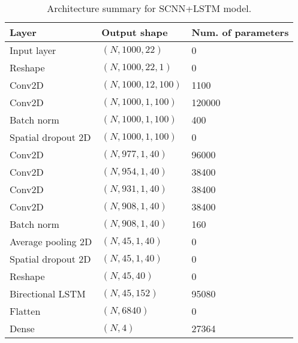 \documentclass{article}
\begin{document}
\begin{table}[H]
\small
\begin{center}
    \begin{tabular}{|l|l|l|}
        \hline
        Layer   & Output shape  & Num. of parameters \\
        \hline\hline
        Input layer         & $(N, 1000, 22)$       & 0         \\
        Reshape             & $(N, 1000, 22, 1)$    & 0         \\
        Conv2D              & $(N, 1000, 12, 100)$  & 1100      \\
        Conv2D              & $(N, 1000, 1, 100)$   & 120000    \\
        Batch norm          & $(N, 1000, 1, 100)$   & 400       \\
        Spatial dropout 2D  & $(N, 1000, 1, 100)$   & 0         \\
        Conv2D              & $(N, 977, 1, 40)$     & 96000     \\
        Conv2D              & $(N, 954, 1,40)$      & 38400     \\
        Conv2D              & $(N, 931, 1, 40)$     & 38400     \\
        Conv2D              & $(N, 908, 1, 40)$     & 38400     \\
        Batch norm          & $(N, 908, 1, 40)$     & 160       \\
        Average pooling 2D  & $(N, 45, 1, 40)$      & 0         \\
        Spatial dropout 2D  & $(N, 45, 1, 40)$      & 0         \\
        Reshape             & $(N, 45, 40)$         & 0         \\
        Birectional LSTM    & $(N, 45, 152)$        & 95080     \\
        Flatten             & $(N, 6840)$           & 0         \\
        Dense               & $(N, 4)$              & 27364     \\
        \hline
    \end{tabular}
\end{center}
\caption{Architecture summary for SCNN+LSTM model.}
\label{tab:lstm}
\end{table}
\end{document}
